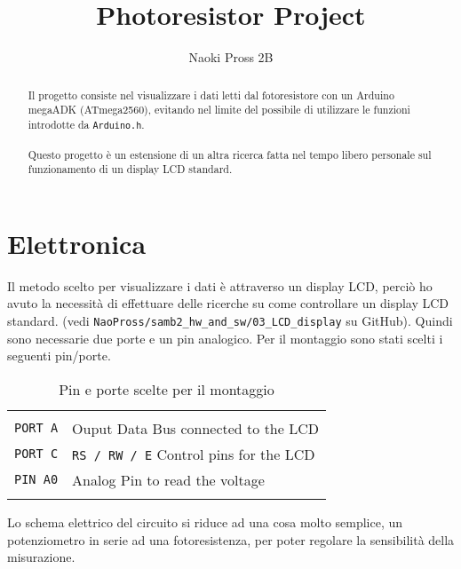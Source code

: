 \documentclass[a4paper]{proc}
\begin{document}
	\author{Naoki Pross 2B}
	\title{Photoresistor Project}
	\maketitle
	
	\begin{abstract}
		Il progetto consiste nel visualizzare i dati letti dal fotoresistore con
		un Arduino megaADK (ATmega2560), evitando nel limite del possibile di
		utilizzare le funzioni introdotte da \texttt{Arduino.h}.\\\\
		Questo progetto \`e un estensione di un altra ricerca fatta nel tempo
		libero personale sul funzionamento di un display LCD standard.
	\end{abstract}
	
	\section{Elettronica}
	Il metodo scelto per visualizzare i dati \`e attraverso un display LCD, perci\`o
	ho avuto la necessit\`a di effettuare delle ricerche su come controllare un display
	LCD standard. (vedi \texttt{NaoPross/samb2\_hw\_and\_sw/03\_LCD\_display} su GitHub).
	Quindi sono necessarie due porte e un pin analogico. Per il montaggio sono stati 
	scelti i seguenti pin/porte.
	
	\begin{table}[h]
		\caption{Pin e porte scelte per il montaggio}
		\centering \begin{tabular}{ l l }
			\hline \\
			\texttt{PORT A} & Ouput Data Bus connected to the LCD \\
			\texttt{PORT C} & \texttt{RS / RW / E} Control pins for the LCD\\
			\texttt{PIN A0} & Analog Pin to read the voltage\\
			\\ \hline
		\end{tabular}
	\end{table}
	
	Lo schema elettrico del circuito si riduce ad una cosa molto semplice,
	un potenziometro in serie ad una fotoresistenza, per poter regolare la sensibilit\`a
	della misurazione.
	
\end{document}
